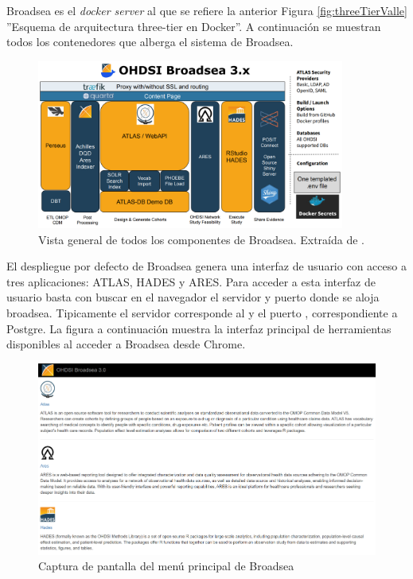 Broadsea es el \textit{docker server} al que se refiere la anterior Figura \ref{fig:threeTierValle} ''Esquema de arquitectura three-tier en Docker''. A continuación se muestran todos los contenedores que alberga el sistema de Broadsea.

\begin{figure}[H]
    \centering
    \includegraphics[width=0.90\textwidth]{figures/OHDSIBroadsea3.0.png}
    \caption{Vista general de todos los componentes de Broadsea. Extraída de \parencite{Broadsea3PPTX}.}
    \label{fig:OHDSIBroadsea3.0}
\end{figure}

El despliegue por defecto de Broadsea genera una interfaz de usuario con acceso a tres aplicaciones: ATLAS, HADES y ARES. Para acceder a esta interfaz de usuario basta con buscar en el navegador el servidor y puerto donde se aloja broadsea. Tipicamente el servidor corresponde al  y el puerto , correspondiente a Postgre. La figura a continuación muestra la interfaz principal de herramientas disponibles al acceder a Broadsea desde Chrome.

\begin{figure}[H]
    \centering
    \includegraphics[width=1\textwidth]{figures/homeBroadsea.png}
    \caption{Captura de pantalla del menú principal de Broadsea}
    \label{fig:homeBroadsea}
\end{figure}

